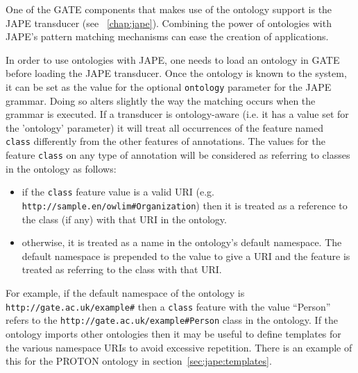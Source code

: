 {%
%
%

One of the GATE components that makes use of the ontology support is the JAPE
transducer (see \Chapthing~\ref{chap:jape}). Combining the power of ontologies
with JAPE's pattern matching mechanisms can ease the creation of applications.

In order to use ontologies with JAPE, one needs to load an ontology in GATE
before loading the JAPE transducer. Once the ontology is known to the system, it
can be set as the value for the optional {\tt ontology} parameter for the JAPE
grammar. Doing so alters slightly the way the matching occurs when the grammar
is executed. If a transducer is ontology-aware (i.e. it has a value set for the
'ontology' parameter) it will treat all occurrences of the feature named {\tt
class} differently from the other features of annotations.  The values for the
feature {\tt class} on any type of annotation will be considered as referring
to classes in the ontology as follows:
\begin{itemize}
\item if the {\tt class} feature value is a valid URI (e.g.
  \verb|http://sample.en/owlim#Organization|) then it is treated as a reference
  to the class (if any) with that URI in the ontology.
\item otherwise, it is treated as a name in the ontology's default namespace.
  The default namespace is prepended to the value to give a URI and the feature
  is treated as referring to the class with that URI.
\end{itemize}
%
For example, if the default namespace of the ontology is
\verb|http://gate.ac.uk/example#| then a {\tt class} feature with the value
``Person'' refers to the \verb|http://gate.ac.uk/example#Person| class in the
ontology.  If the ontology imports other ontologies then it may be useful to
define templates for the various namespace URIs to avoid excessive repetition.
There is an example of this for the PROTON ontology in
section~\ref{sec:jape:templates}.

}
